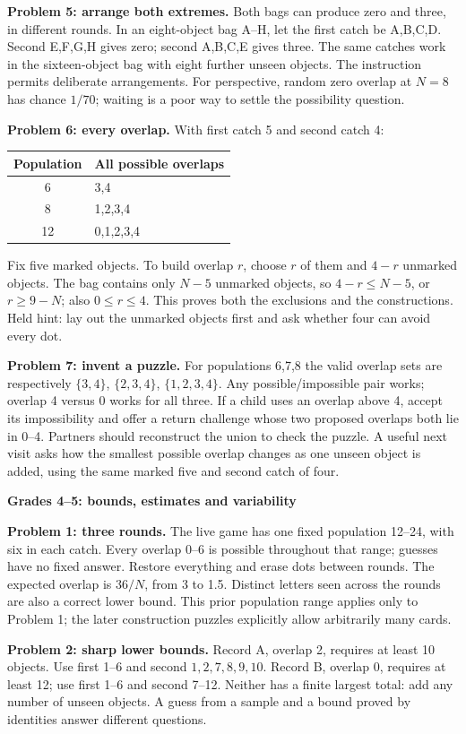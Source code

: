\documentclass[letterpaper,11pt]{article}
\newcommand{\topic}[1]{\par\medskip\textbf{#1}\par}
\begin{document}
\textbf{Problem 5: arrange both extremes.} Both bags can produce zero and three, in different rounds. In an eight-object bag A--H, let the first catch be A,B,C,D. Second E,F,G,H gives zero; second A,B,C,E gives three. The same catches work in the sixteen-object bag with eight further unseen objects. The instruction permits deliberate arrangements. For perspective, random zero overlap at $N=8$ has chance $1/70$; waiting is a poor way to settle the possibility question.

\textbf{Problem 6: every overlap.} With first catch 5 and second catch 4:
\begin{center}\begin{tabular}{c|l}
Population & All possible overlaps\\\hline
6 & 3,4\\
8 & 1,2,3,4\\
12 & 0,1,2,3,4
\end{tabular}\end{center}
Fix five marked objects. To build overlap $r$, choose $r$ of them and $4-r$ unmarked objects. The bag contains only $N-5$ unmarked objects, so $4-r\le N-5$, or $r\ge9-N$; also $0\le r\le4$. This proves both the exclusions and the constructions. Held hint: lay out the unmarked objects first and ask whether four can avoid every dot.

\textbf{Problem 7: invent a puzzle.} For populations 6,7,8 the valid overlap sets are respectively $\{3,4\}$, $\{2,3,4\}$, $\{1,2,3,4\}$. Any possible/impossible pair works; overlap 4 versus 0 works for all three. If a child uses an overlap above 4, accept its impossibility and offer a return challenge whose two proposed overlaps both lie in 0--4. Partners should reconstruct the union to check the puzzle. A useful next visit asks how the smallest possible overlap changes as one unseen object is added, using the same marked five and second catch of four.
\newpage
\topic{Grades 4--5: bounds, estimates and variability}
\textbf{Problem 1: three rounds.} The live game has one fixed population 12--24, with six in each catch. Every overlap 0--6 is possible throughout that range; guesses have no fixed answer. Restore everything and erase dots between rounds. The expected overlap is $36/N$, from 3 to 1.5. Distinct letters seen across the rounds are also a correct lower bound. This prior population range applies only to Problem 1; the later construction puzzles explicitly allow arbitrarily many cards.

\textbf{Problem 2: sharp lower bounds.} Record A, overlap 2, requires at least 10 objects. Use first 1--6 and second $1,2,7,8,9,10$. Record B, overlap 0, requires at least 12; use first 1--6 and second 7--12. Neither has a finite largest total: add any number of unseen objects. A guess from a sample and a bound proved by identities answer different questions.
\end{document}
